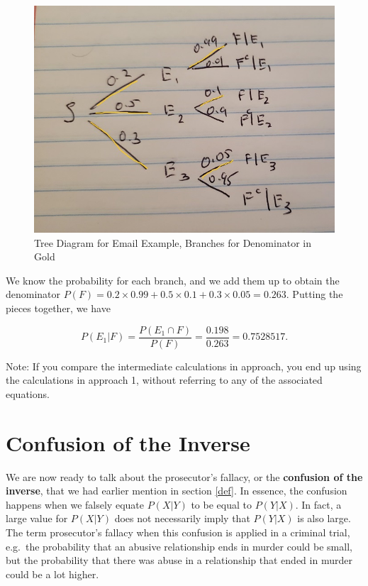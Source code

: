 \documentclass[
]{book}
\begin{document}
\begin{figure}
\centering
\includegraphics{images/02-treepath2.jpg}
\caption{\label{fig:tree2}Tree Diagram for Email Example, Branches for Denominator in Gold}
\end{figure}

We know the probability for each branch, and we add them up to obtain the denominator \(P(F) = 0.2 \times 0.99 + 0.5 \times 0.1 + 0.3 \times 0.05 = 0.263.\) Putting the pieces together, we have

\[
P(E_1|F) = \frac{P(E_1 \cap F)}{P(F)} = \frac{0.198}{0.263} = 0.7528517.
\]

Note: If you compare the intermediate calculations in approach, you end up using the calculations in approach 1, without referring to any of the associated equations.

\section{Confusion of the Inverse}\label{confusion-of-the-inverse}

We are now ready to talk about the prosecutor's fallacy, or the \textbf{confusion of the inverse}, that we had earlier mention in section \ref{def}. In essence, the confusion happens when we falsely equate \(P(X|Y)\) to be equal to \(P(Y|X)\). In fact, a large value for \(P(X|Y)\) does not necessarily imply that \(P(Y|X)\) is also large. The term prosecutor's fallacy when this confusion is applied in a criminal trial, e.g.~the probability that an abusive relationship ends in murder could be small, but the probability that there was abuse in a relationship that ended in murder could be a lot higher.
\end{document}
